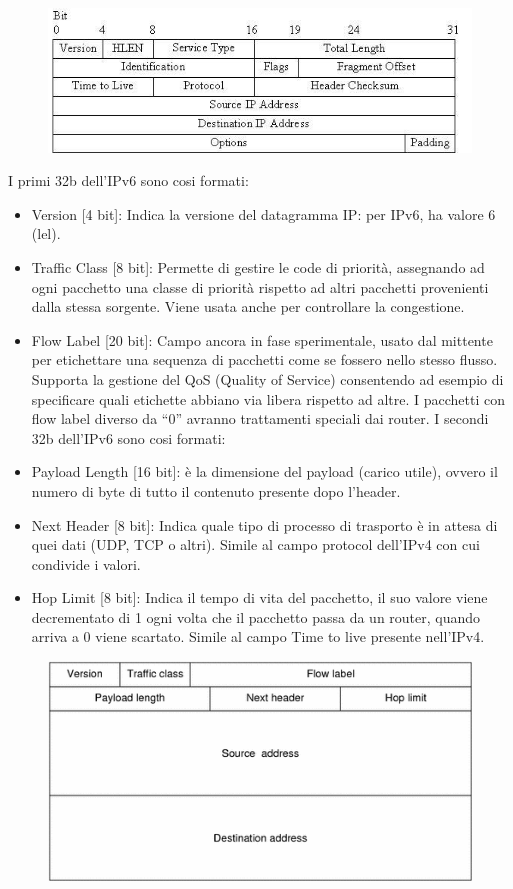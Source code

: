 \begin{figure}[H]
\centering
\includegraphics[scale=0.6]{res/img/46_IPv4.png}
\end{figure}

I primi 32b dell’IPv6 sono cosi formati:
\begin{itemize}
\item	Version [4 bit]: Indica la versione del datagramma IP: per IPv6, ha valore 6 (lel).
\item	Traffic Class [8 bit]: Permette di gestire le code di priorità, assegnando ad ogni pacchetto una classe di priorità rispetto ad altri pacchetti provenienti dalla stessa sorgente. Viene usata anche per controllare la congestione.
\item	Flow Label [20 bit]: Campo ancora in fase sperimentale, usato dal mittente per etichettare una sequenza di pacchetti come se fossero nello stesso flusso. Supporta la gestione del QoS (Quality of Service) consentendo ad esempio di specificare quali etichette abbiano via libera rispetto ad altre. I pacchetti con flow label diverso da “0” avranno trattamenti speciali dai router.
I secondi 32b dell’IPv6 sono cosi formati:
\item	Payload Length [16 bit]: è la dimensione del payload (carico utile), ovvero il numero di byte di tutto il contenuto presente dopo l’header.
\item	Next Header [8 bit]: Indica quale tipo di processo di trasporto è in attesa di quei dati (UDP, TCP o altri). Simile al campo protocol dell’IPv4 con cui condivide i valori.
\item	Hop Limit [8 bit]: Indica il tempo di vita del pacchetto, il suo valore viene decrementato di 1 ogni volta che il pacchetto passa da un router, quando arriva a 0 viene scartato. Simile al campo Time to live presente nell’IPv4.
\end{itemize}

\begin{figure}[H]
\centering
\includegraphics[scale=0.6]{res/img/46_IPv6.png}
\end{figure}

